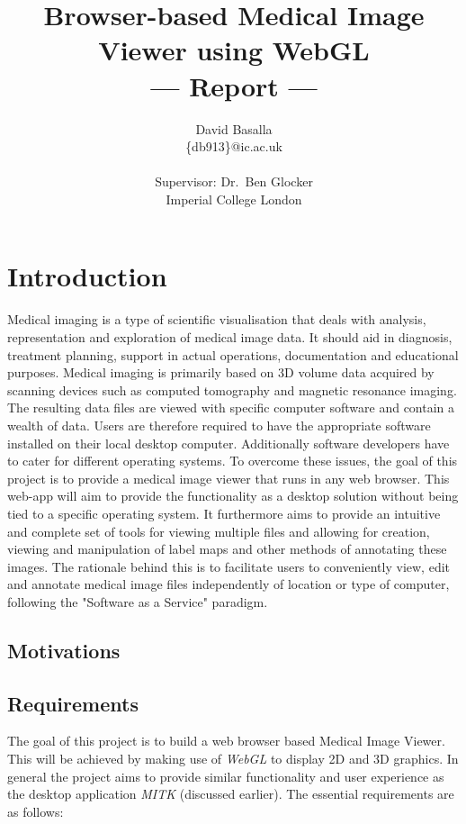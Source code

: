\documentclass[a4paper,11pt,titlepage]{article}
\title{Browser-based Medical Image Viewer using WebGL \\\Large{--- Report ---}}
\author{David Basalla\\
       \{db913\}@ic.ac.uk\\ \\
       \small{Supervisor: Dr.\ Ben Glocker}\\
       \small{Imperial College London}
}
\begin{document}
\maketitle



\section{Introduction}

Medical imaging is a type of scientific visualisation that deals with analysis, representation and exploration of medical image data. It should aid in diagnosis, treatment planning, support in actual operations, documentation and educational purposes. Medical imaging is primarily based on 3D volume data acquired by scanning devices such as computed tomography and magnetic resonance imaging. The resulting data files are viewed with specific computer software and contain a wealth of data. Users are therefore required to have the appropriate software installed on their local desktop computer. Additionally software developers have to cater for different operating systems. To overcome these issues, the goal of this project is to provide a medical image viewer that runs in any web browser. This web-app will aim to provide the functionality as a desktop solution without being tied to a specific operating system. It furthermore aims to provide an intuitive and complete set of tools for viewing multiple files and allowing for creation, viewing and manipulation of label maps and other methods of annotating these images. The rationale behind this is to facilitate users to conveniently view, edit and annotate medical image files independently of location or type of computer, following the "Software as a Service" paradigm.

\subsection{Motivations}

\subsection{Requirements}


The goal of this project is to build a web browser based Medical Image Viewer. This will be achieved by making use of \textit{WebGL} to display 2D and 3D graphics. In general the project aims to provide similar functionality and user experience as the desktop application \textit{MITK} (discussed earlier). The essential requirements are as follows:
\end{document}
